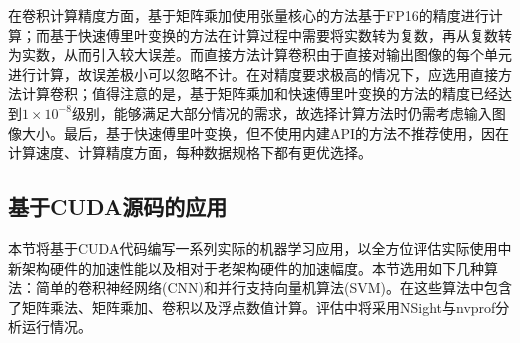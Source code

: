 \par 在卷积计算精度方面，基于矩阵乘加使用张量核心的方法基于FP16的精度进行计算；而基于快速傅里叶变换的方法在计算过程中需要将实数转为复数，再从复数转为实数，从而引入较大误差。而直接方法计算卷积由于直接对输出图像的每个单元进行计算，故误差极小可以忽略不计。在对精度要求极高的情况下，应选用直接方法计算卷积；值得注意的是，基于矩阵乘加和快速傅里叶变换的方法的精度已经达到$ 1\times 10^{-8} $级别，能够满足大部分情况的需求，故选择计算方法时仍需考虑输入图像大小。最后，基于快速傅里叶变换，但不使用内建API的方法不推荐使用，因在计算速度、计算精度方面，每种数据规格下都有更优选择。

\subsection{基于CUDA源码的应用}
\par 本节将基于CUDA代码编写一系列实际的机器学习应用，以全方位评估实际使用中新架构硬件的加速性能以及相对于老架构硬件的加速幅度。本节选用如下几种算法：简单的卷积神经网络(CNN)和并行支持向量机算法(SVM)。在这些算法中包含了矩阵乘法、矩阵乘加、卷积以及浮点数值计算。评估中将采用NSight与nvprof分析运行情况。
